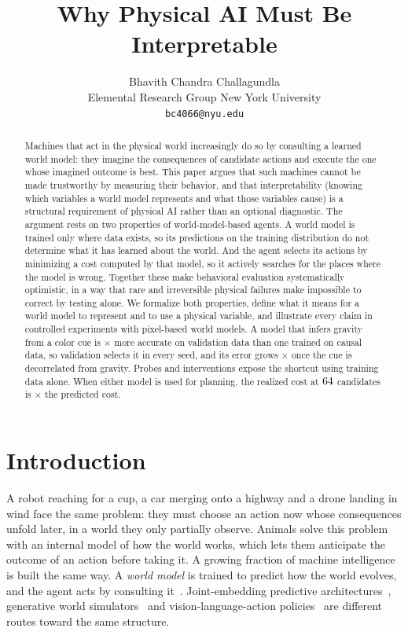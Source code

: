 \documentclass[11pt]{article}
\title{\textbf{Why Physical AI Must Be Interpretable}}
\author{Bhavith Chandra Challagundla\\[2pt]
\normalsize Elemental Research Group \qquad New York University\\
\normalsize\texttt{bc4066@nyu.edu}}
\date{}
\theoremstyle{definition}\newtheorem{definition}{Definition}
\begin{document}
\maketitle

\begin{abstract}
\noindent
Machines that act in the physical world increasingly do so by consulting a learned world model: they imagine the consequences of candidate actions and execute the one whose imagined outcome is best. This paper argues that such machines cannot be made trustworthy by measuring their behavior, and that interpretability (knowing which variables a world model represents and what those variables cause) is a structural requirement of physical AI rather than an optional diagnostic. The argument rests on two properties of world-model-based agents. A world model is trained only where data exists, so its predictions on the training distribution do not determine what it has learned about the world. And the agent selects its actions by minimizing a cost computed by that model, so it actively searches for the places where the model is wrong. Together these make behavioral evaluation systematically optimistic, in a way that rare and irreversible physical failures make impossible to correct by testing alone. We formalize both properties, define what it means for a world model to represent and to use a physical variable, and illustrate every claim in controlled experiments with pixel-based world models. A model that infers gravity from a color cue is \ratioValClCo$\times$ more accurate on validation data than one trained on causal data, so validation selects it in every seed, and its error grows \ratioDecVal$\times$ once the cue is decorrelated from gravity. Probes and interventions expose the shortcut using training data alone. When either model is used for planning, the realized cost at $64$ candidates is \plRatio$\times$ the predicted cost.
\end{abstract}

\section{Introduction}
A robot reaching for a cup, a car merging onto a highway and a drone landing in wind face the same problem: they must choose an action now whose consequences unfold later, in a world they only partially observe. Animals solve this problem with an internal model of how the world works, which lets them anticipate the outcome of an action before taking it. A growing fraction of machine intelligence is built the same way. A \emph{world model} is trained to predict how the world evolves, and the agent acts by consulting it~\citep{sutton1991dyna,ha2018world,lecun2022path,hafner2023dreamerv3}. Joint-embedding predictive architectures~\citep{assran2023ijepa,assran2025vjepa2}, generative world simulators~\citep{bruce2024genie,nvidia2025cosmos} and vision-language-action policies~\citep{brohan2023rt2,kim2024openvla,black2024pi0} are different routes toward the same structure.
\end{document}
